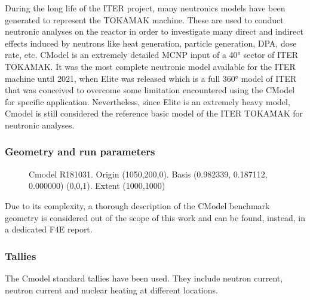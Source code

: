 \documentclass[letterpaper,10pt,english]{sphinxmanual}
\let\sphinxpxdimen\pdfpxdimen\else\newdimen\sphinxpxdimen
\begin{document}
During the long life of the ITER project, many neutronics models have been generated to represent the
TOKAMAK machine. These are used to conduct neutronic analyses on the reactor in order to investigate
many direct and indirect effects induced by neutrons like heat generation, particle generation, DPA,
dose rate, etc. C\sphinxhyphen{}Model is an extremely detailed MCNP input of a 40° sector of ITER TOKAMAK. It was
the most complete neutronic model available for the ITER machine until 2021, when E\sphinxhyphen{}lite was released
which is a full 360° model of ITER that was conceived to overcome some limitation encountered using
the C\sphinxhyphen{}Model for specific application. Nevertheless, since E\sphinxhyphen{}lite is an extremely heavy model, C\sphinxhyphen{}model
is still considered the reference basic model of the ITER TOKAMAK for neutronic analyses.


\subsubsection{Geometry and run parameters}
\label{\detokenize{usage/benchmarks:id5}}
\begin{figure}[htbp]
\centering
\capstart

\noindent\sphinxincludegraphics[width=600\sphinxpxdimen]{{cmodel}.png}
\caption{C\sphinxhyphen{}model R181031. Origin (1050,200,0). Basis (0.982339, 0.187112, 0.000000)
(0,0,1). Extent (1000,1000)}\label{\detokenize{usage/benchmarks:id25}}\end{figure}

Due to its complexity, a thorough description of the C\sphinxhyphen{}Model benchmark geometry is considered out of
the scope of this work and can be found, instead, in a dedicated F4E report.


\subsubsection{Tallies}
\label{\detokenize{usage/benchmarks:id6}}
The C\sphinxhyphen{}model standard tallies have been used. They include neutron current,
neutron current and nuclear heating at different locations.


\end{document}
